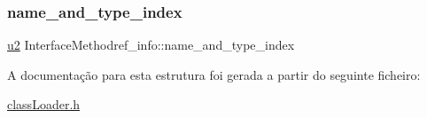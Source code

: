 \subsubsection{\texorpdfstring{name\+\_\+and\+\_\+type\+\_\+index}{name\_and\_type\_index}}
{\footnotesize\ttfamily \hyperlink{util_8h_a55ef8d87fd202b8417704c089899c5b9}{u2} Interface\+Methodref\+\_\+info\+::name\+\_\+and\+\_\+type\+\_\+index}



A documentação para esta estrutura foi gerada a partir do seguinte ficheiro\+:\begin{DoxyCompactItemize}
\item 
\hyperlink{class_loader_8h}{class\+Loader.\+h}\end{DoxyCompactItemize}
